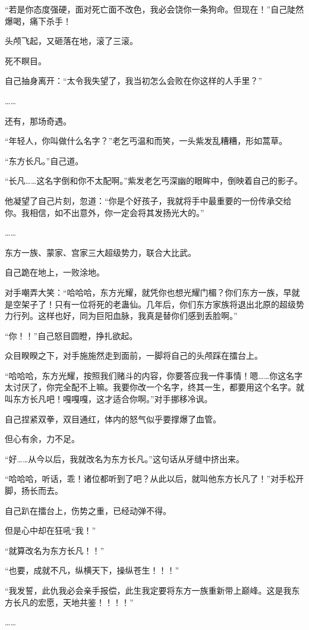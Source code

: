 \begin{this_body}
“若是你态度强硬，面对死亡面不改色，我必会饶你一条狗命。但现在！”自己陡然爆喝，痛下杀手！

头颅飞起，又砸落在地，滚了三滚。

死不瞑目。

自己抽身离开：“太令我失望了，我当初怎么会败在你这样的人手里？”

……

还有，那场奇遇。

“年轻人，你叫做什么名字？”老乞丐温和而笑，一头紫发乱糟糟，形如蒿草。

“东方长凡。”自己道。

“长凡……这名字倒和你不太配啊。”紫发老乞丐深幽的眼眸中，倒映着自己的影子。

他凝望了自己片刻，忽道：“你是个好孩子，我就将手中最重要的一份传承交给你。我相信，如不出意外，你一定会将其发扬光大的。”

……

东方一族、蒙家、宫家三大超级势力，联合大比武。

自己跪在地上，一败涂地。

对手嘲弄大笑：“哈哈哈，东方光耀，就凭你也想光耀门楣？你们东方一族，早就是空架子了！只有一位将死的老蛊仙。几年后，你们东方家族将退出北原的超级势力行列。这样也好，同为巨阳血脉，我真是替你们感到丢脸啊。”

“你！！”自己怒目圆瞪，挣扎欲起。

众目睽睽之下，对手施施然走到面前，一脚将自己的头颅踩在擂台上。

“哈哈哈，东方光耀，按照我们赌斗的内容，你要答应我一件事情！嗯……你这名字太讨厌了，你完全配不上嘛。我要你改一个名字，终其一生，都要用这个名字。就叫东方长凡吧！嘎嘎嘎，这才适合你啊。”对手挪移冷讽。

自己捏紧双拳，双目通红，体内的怒气似乎要撑爆了血管。

但心有余，力不足。

“好……从今以后，我就改名为东方长凡。”这句话从牙缝中挤出来。

“哈哈哈，听话，乖！诸位都听到了吧？从此以后，就叫他东方长凡了！”对手松开脚，扬长而去。

自己趴在擂台上，伤势之重，已经动弹不得。

但是心中却在狂吼“我！”

“就算改名为东方长凡！！”

“也要，成就不凡，纵横天下，操纵苍生！！！”

“我发誓，此仇我必会亲手报偿，此生我定要将东方一族重新带上巅峰。这是我东方长凡的宏愿，天地共鉴！！！！”

……


\end{this_body}
